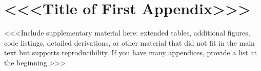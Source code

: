 \documentclass[12pt,a4paper,twocolumn]{article}
\begin{document}

\newpage
\onecolumn  %

\appendix

\section{<<<Title of First Appendix>>>}
\label{app:first}

<<<Include supplementary material here: extended tables, additional
figures, code listings, detailed derivations, or other material that
did not fit in the main text but supports reproducibility. If you
have many appendices, provide a list at the beginning.>>>

\end{document}
